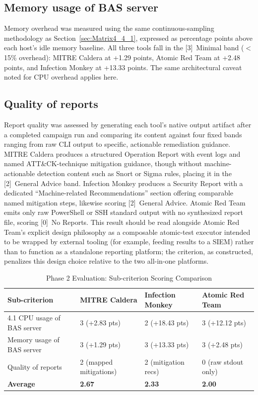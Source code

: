 \subsection{Memory usage of BAS server}\label{sec:Matrix4_im_4_2}

Memory overhead was measured using the same continuous-sampling methodology as Section~\ref{sec:Matrix4_4_1}, expressed as percentage points above each host's idle memory baseline. All three tools fall in the [3]~Minimal band ($<$15\% overhead): MITRE Caldera at +1.29 points, Atomic Red Team at +2.48 points, and Infection Monkey at +13.33 points. The same architectural caveat noted for CPU overhead applies here.

\subsection{Quality of reports}\label{sec:Matrix4_4_3}

Report quality was assessed by generating each tool's native output artifact after a completed campaign run and comparing its content against four fixed bands ranging from raw CLI output to specific, actionable remediation guidance. MITRE Caldera produces a structured Operation Report with event logs and named ATT\&CK-technique mitigation guidance, though without machine-actionable detection content such as Snort or Sigma rules, placing it in the [2]~General Advice band. Infection Monkey produces a Security Report with a dedicated ``Machine-related Recommendations'' section offering comparable named mitigation steps, likewise scoring [2]~General Advice. Atomic Red Team emits only raw PowerShell or SSH standard output with no synthesized report file, scoring [0]~No Reports. This result should be read alongside Atomic Red Team's explicit design philosophy as a composable atomic-test executor intended to be wrapped by external tooling (for example, feeding results to a SIEM) rather than to function as a standalone reporting platform; the criterion, as constructed, penalizes this design choice relative to the two all-in-one platforms.

\begin{table}
    \centering
    \caption{Phase 2 Evaluation: Sub-criterion Scoring Comparison}
    \small
    \begin{tabularx}{\textwidth}{lXXX}
        \toprule
        \textbf{Sub-criterion} & \textbf{MITRE Caldera} & \textbf{Infection Monkey} & \textbf{Atomic Red Team} \\
        \midrule
        4.1 CPU usage of BAS server & 3 (+2.83 pts) & 2 (+18.43 pts) & 3 (+12.12 pts) \\
        \addlinespace
        4.2 Memory usage of BAS server & 3 (+1.29 pts) & 3 (+13.33 pts) & 3 (+2.48 pts) \\
        \addlinespace
        4.3 Quality of reports & 2 (mapped mitigations) & 2 (mitigation recs) & 0 (raw stdout only) \\
        \midrule
        \textbf{Average} & \textbf{2.67} & \textbf{2.33} & \textbf{2.00} \\
        \bottomrule
    \end{tabularx}
\end{table}

